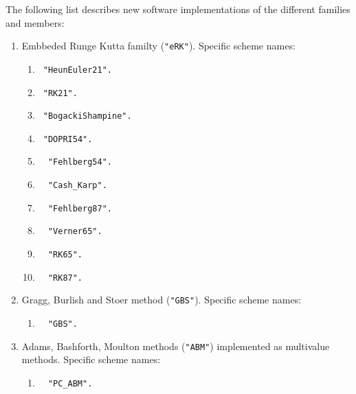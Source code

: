 The following list describes new software implementations of the different families and members:  
 \begin{enumerate} 
    \item   Embbeded Runge Kutta familty (\verb|"eRK"|). Specific scheme names:  
         \begin{enumerate} 
         \setlength\itemsep{0cm}
          \item \verb| "HeunEuler21".  |
          \item \verb| "RK21".  |
          \item \verb| "BogackiShampine".  |
          \item \verb| "DOPRI54".      |
          \item \verb|  "Fehlberg54".  |
          \item \verb|  "Cash_Karp".   |
          \item \verb|  "Fehlberg87".  |
          \item \verb|  "Verner65".    |
          \item \verb|  "RK65".        |
          \item \verb|  "RK87".        |
        \end{enumerate}  
    \item  Gragg,  Burlish and Stoer method (\verb|"GBS"|). Specific scheme names: 
               \begin{enumerate} 
                  \item  \verb|  "GBS". |  
               \end{enumerate}     
    \item  Adams, Bashforth, Moulton methods (\verb|"ABM"|) implemented as multivalue methods. Specific scheme names: 
                \begin{enumerate} 
                   \item  \verb|  "PC_ABM". |
                 \end{enumerate} 
  \end{enumerate} 



